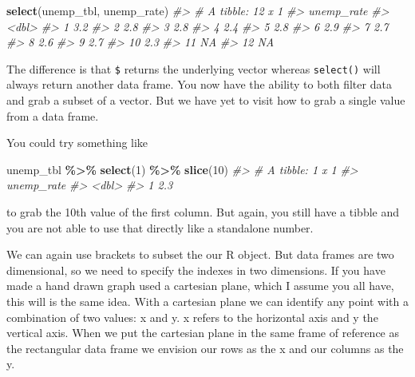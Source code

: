 \documentclass[
]{book}
\newenvironment{Shaded}{\begin{snugshade}}{\end{snugshade}}
\newcommand{\CommentTok}[1]{\textcolor[rgb]{0.56,0.35,0.01}{\textit{#1}}}
\newcommand{\DecValTok}[1]{\textcolor[rgb]{0.00,0.00,0.81}{#1}}
\newcommand{\KeywordTok}[1]{\textcolor[rgb]{0.13,0.29,0.53}{\textbf{#1}}}
\newcommand{\NormalTok}[1]{#1}
\newcommand{\OperatorTok}[1]{\textcolor[rgb]{0.81,0.36,0.00}{\textbf{#1}}}
\newcommand{\StringTok}[1]{\textcolor[rgb]{0.31,0.60,0.02}{#1}}
\begin{document}
\begin{Shaded}
\begin{Highlighting}[]
\KeywordTok{select}\NormalTok{(unemp\_tbl, unemp\_rate)}
\CommentTok{\#\textgreater{} \# A tibble: 12 x 1}
\CommentTok{\#\textgreater{}    unemp\_rate}
\CommentTok{\#\textgreater{}         \textless{}dbl\textgreater{}}
\CommentTok{\#\textgreater{}  1        3.2}
\CommentTok{\#\textgreater{}  2        2.8}
\CommentTok{\#\textgreater{}  3        2.8}
\CommentTok{\#\textgreater{}  4        2.4}
\CommentTok{\#\textgreater{}  5        2.8}
\CommentTok{\#\textgreater{}  6        2.9}
\CommentTok{\#\textgreater{}  7        2.7}
\CommentTok{\#\textgreater{}  8        2.6}
\CommentTok{\#\textgreater{}  9        2.7}
\CommentTok{\#\textgreater{} 10        2.3}
\CommentTok{\#\textgreater{} 11       NA  }
\CommentTok{\#\textgreater{} 12       NA}
\end{Highlighting}
\end{Shaded}

The difference is that \texttt{\$} returns the underlying vector whereas \texttt{select()} will always return another data frame. You now have the ability to both filter data and grab a subset of a vector. But we have yet to visit how to grab a single value from a data frame.

You could try something like

\begin{Shaded}
\begin{Highlighting}[]
\NormalTok{unemp\_tbl }\OperatorTok{\%\textgreater{}\%}\StringTok{ }
\StringTok{  }\KeywordTok{select}\NormalTok{(}\DecValTok{1}\NormalTok{) }\OperatorTok{\%\textgreater{}\%}\StringTok{ }
\StringTok{  }\KeywordTok{slice}\NormalTok{(}\DecValTok{10}\NormalTok{)}
\CommentTok{\#\textgreater{} \# A tibble: 1 x 1}
\CommentTok{\#\textgreater{}   unemp\_rate}
\CommentTok{\#\textgreater{}        \textless{}dbl\textgreater{}}
\CommentTok{\#\textgreater{} 1        2.3}
\end{Highlighting}
\end{Shaded}

to grab the 10th value of the first column. But again, you still have a tibble and you are not able to use that directly like a standalone number.

We can again use brackets to subset the our R object. But data frames are two dimensional, so we need to specify the indexes in two dimensions. If you have made a hand drawn graph used a cartesian plane, which I assume you all have, this will is the same idea. With a cartesian plane we can identify any point with a combination of two values: x and y. x refers to the horizontal axis and y the vertical axis. When we put the cartesian plane in the same frame of reference as the rectangular data frame we envision our rows as the x and our columns as the y.
\end{document}
